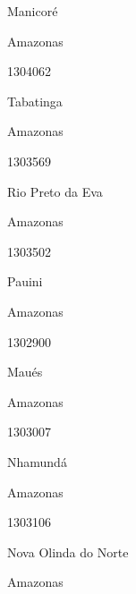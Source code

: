 \documentclass[
  letterpaper,
]{report}
\begin{document}
Manicoré

\n    

\n    

\n      

Amazonas

\n      

1304062

\n      

Tabatinga

\n    

\n    

\n      

Amazonas

\n      

1303569

\n      

Rio Preto da Eva

\n    

\n    

\n      

Amazonas

\n      

1303502

\n      

Pauini

\n    

\n    

\n      

Amazonas

\n      

1302900

\n      

Maués

\n    

\n    

\n      

Amazonas

\n      

1303007

\n      

Nhamundá

\n    

\n    

\n      

Amazonas

\n      

1303106

\n      

Nova Olinda do Norte

\n    

\n    

\n      

Amazonas
\end{document}

